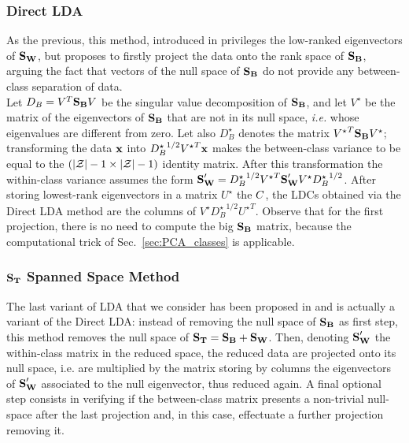 \subsubsection{Direct LDA}
As the previous, this method, introduced in \cite{Yu01adirect} privileges the low-ranked eigenvectors of $\textbf{S}_{\textbf{W}}$, but proposes to firstly project the data onto the rank space of $\textbf{S}_{\textbf{B}}$, arguing the fact that vectors of the null space of $\textbf{S}_{\textbf{B}}$ do not provide any between-class separation of data. \\
Let $D_B=V^T\textbf{S}_{\textbf{B}} V$ be the singular value decomposition of $\textbf{S}_{\textbf{B}}$, and let $V^\star$ be the matrix of the eigenvectors of $\textbf{S}_{\textbf{B}}$ that are not in its null space, \textit{i.e.} whose eigenvalues are different from zero. Let also $D_B^\star$ denotes the matrix ${V^\star}^T\textbf{S}_{\textbf{B}} V^\star$; transforming the data $\textbf{x}$ into ${D_B^\star}^{1/2}{V^\star}^T\textbf{x}$ makes the between-class variance to be equal to   the $(\lvert \mathcal{Z} \rvert - 1 \times \lvert \mathcal{Z} \rvert - 1)$ identity matrix. After this transformation the within-class variance assumes the form $\textbf{S}_{\textbf{W}}' = {D_B^\star}^{1/2}{V^\star}^T\textbf{S}_{\textbf{W}} ' V^\star {D_B^\star}^{1/2}$. After storing lowest-rank eigenvectors in a matrix $U^\star$ the $C$, the LDCs obtained via the Direct LDA method are the columns of $V^\star{D_B^\star}^{1/2}{U^\star}^T$. Observe that for the first projection, there is no need to compute the big $\textbf{S}_{\textbf{B}}$ matrix, because the computational trick of Sec.~\ref{sec:PCA_classes} is applicable.


\subsubsection{$\textbf{S}_{\textbf{T}}$ Spanned Space Method}
The last variant of LDA that we consider has been proposed in \cite{huang} and is actually a variant of the Direct LDA: instead of removing the null space of $\textbf{S}_{\textbf{B}}$ as first step, this method removes the null space of $\textbf{S}_{\textbf{T}} = \textbf{S}_{\textbf{B}} + \textbf{S}_{\textbf{W}}$. Then, denoting $\textbf{S}_{\textbf{W}}'$ the within-class matrix in the reduced space, the reduced data are projected onto its null space, i.e. are multiplied by the matrix storing by columns the eigenvectors of $\textbf{S}_{\textbf{W}}'$ associated to the null eigenvector, thus reduced again. A final optional step consists in verifying if  the between-class matrix presents a non-trivial null-space after the last projection and, in this case, effectuate a further projection removing it.




